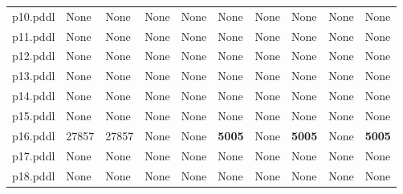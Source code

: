 \documentclass{article}
\begin{document}
\begin{tabular}{@{}lrrrrrrrrr@{}}
p10.pddl & \multicolumn{1}{|l|}{None} & \multicolumn{1}{|l|}{None} & \multicolumn{1}{|l|}{None} & \multicolumn{1}{|l|}{None} & \multicolumn{1}{|l|}{None} & \multicolumn{1}{|l|}{None} & \multicolumn{1}{|l|}{None} & \multicolumn{1}{|l|}{None} & \multicolumn{1}{|l|}{None} \\
p11.pddl & \multicolumn{1}{|l|}{None} & \multicolumn{1}{|l|}{None} & \multicolumn{1}{|l|}{None} & \multicolumn{1}{|l|}{None} & \multicolumn{1}{|l|}{None} & \multicolumn{1}{|l|}{None} & \multicolumn{1}{|l|}{None} & \multicolumn{1}{|l|}{None} & \multicolumn{1}{|l|}{None} \\
p12.pddl & \multicolumn{1}{|l|}{None} & \multicolumn{1}{|l|}{None} & \multicolumn{1}{|l|}{None} & \multicolumn{1}{|l|}{None} & \multicolumn{1}{|l|}{None} & \multicolumn{1}{|l|}{None} & \multicolumn{1}{|l|}{None} & \multicolumn{1}{|l|}{None} & \multicolumn{1}{|l|}{None} \\
p13.pddl & \multicolumn{1}{|l|}{None} & \multicolumn{1}{|l|}{None} & \multicolumn{1}{|l|}{None} & \multicolumn{1}{|l|}{None} & \multicolumn{1}{|l|}{None} & \multicolumn{1}{|l|}{None} & \multicolumn{1}{|l|}{None} & \multicolumn{1}{|l|}{None} & \multicolumn{1}{|l|}{None} \\
p14.pddl & \multicolumn{1}{|l|}{None} & \multicolumn{1}{|l|}{None} & \multicolumn{1}{|l|}{None} & \multicolumn{1}{|l|}{None} & \multicolumn{1}{|l|}{None} & \multicolumn{1}{|l|}{None} & \multicolumn{1}{|l|}{None} & \multicolumn{1}{|l|}{None} & \multicolumn{1}{|l|}{None} \\
p15.pddl & \multicolumn{1}{|l|}{None} & \multicolumn{1}{|l|}{None} & \multicolumn{1}{|l|}{None} & \multicolumn{1}{|l|}{None} & \multicolumn{1}{|l|}{None} & \multicolumn{1}{|l|}{None} & \multicolumn{1}{|l|}{None} & \multicolumn{1}{|l|}{None} & \multicolumn{1}{|l|}{None} \\
p16.pddl & 27857 & 27857 & \multicolumn{1}{|l|}{None} & \multicolumn{1}{|l|}{None} & \textbf{5005} & \multicolumn{1}{|l|}{None} & \textbf{5005} & \multicolumn{1}{|l|}{None} & \textbf{5005} \\
p17.pddl & \multicolumn{1}{|l|}{None} & \multicolumn{1}{|l|}{None} & \multicolumn{1}{|l|}{None} & \multicolumn{1}{|l|}{None} & \multicolumn{1}{|l|}{None} & \multicolumn{1}{|l|}{None} & \multicolumn{1}{|l|}{None} & \multicolumn{1}{|l|}{None} & \multicolumn{1}{|l|}{None} \\
p18.pddl & \multicolumn{1}{|l|}{None} & \multicolumn{1}{|l|}{None} & \multicolumn{1}{|l|}{None} & \multicolumn{1}{|l|}{None} & \multicolumn{1}{|l|}{None} & \multicolumn{1}{|l|}{None} & \multicolumn{1}{|l|}{None} & \multicolumn{1}{|l|}{None} & \multicolumn{1}{|l|}{None} \\

\end{tabular}
\end{document}
